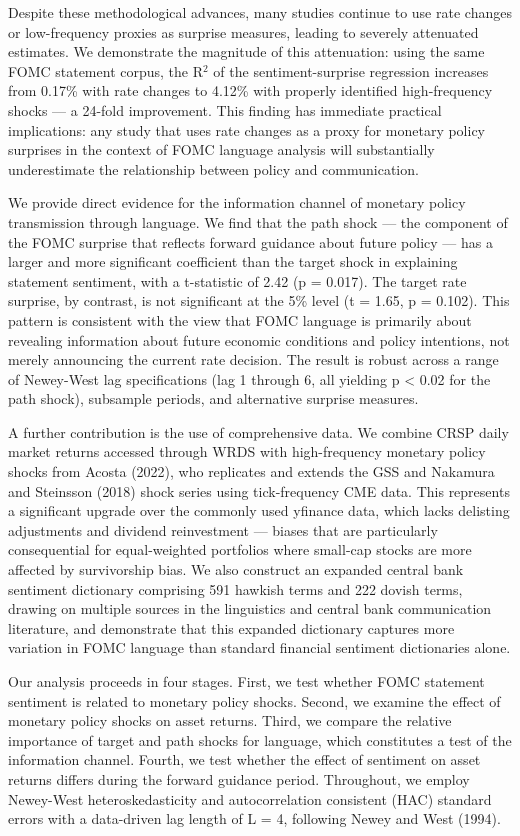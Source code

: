 \documentclass[12pt]{article}
\begin{document}
Despite these methodological advances, many studies continue to use rate changes or low-frequency proxies as surprise measures, leading to severely attenuated estimates. We demonstrate the magnitude of this attenuation: using the same FOMC statement corpus, the R$^2$ of the sentiment-surprise regression increases from 0.17\% with rate changes to 4.12\% with properly identified high-frequency shocks --- a 24-fold improvement. This finding has immediate practical implications: any study that uses rate changes as a proxy for monetary policy surprises in the context of FOMC language analysis will substantially underestimate the relationship between policy and communication.

We provide direct evidence for the information channel of monetary policy transmission through language. We find that the path shock --- the component of the FOMC surprise that reflects forward guidance about future policy --- has a larger and more significant coefficient than the target shock in explaining statement sentiment, with a t-statistic of 2.42 (p = 0.017). The target rate surprise, by contrast, is not significant at the 5\% level (t = 1.65, p = 0.102). This pattern is consistent with the view that FOMC language is primarily about revealing information about future economic conditions and policy intentions, not merely announcing the current rate decision. The result is robust across a range of Newey-West lag specifications (lag 1 through 6, all yielding p < 0.02 for the path shock), subsample periods, and alternative surprise measures.

A further contribution is the use of comprehensive data. We combine CRSP daily market returns accessed through WRDS with high-frequency monetary policy shocks from Acosta (2022), who replicates and extends the GSS and Nakamura and Steinsson (2018) shock series using tick-frequency CME data. This represents a significant upgrade over the commonly used yfinance data, which lacks delisting adjustments and dividend reinvestment --- biases that are particularly consequential for equal-weighted portfolios where small-cap stocks are more affected by survivorship bias. We also construct an expanded central bank sentiment dictionary comprising 591 hawkish terms and 222 dovish terms, drawing on multiple sources in the linguistics and central bank communication literature, and demonstrate that this expanded dictionary captures more variation in FOMC language than standard financial sentiment dictionaries alone.

Our analysis proceeds in four stages. First, we test whether FOMC statement sentiment is related to monetary policy shocks. Second, we examine the effect of monetary policy shocks on asset returns. Third, we compare the relative importance of target and path shocks for language, which constitutes a test of the information channel. Fourth, we test whether the effect of sentiment on asset returns differs during the forward guidance period. Throughout, we employ Newey-West heteroskedasticity and autocorrelation consistent (HAC) standard errors with a data-driven lag length of L = 4, following Newey and West (1994).
\end{document}
